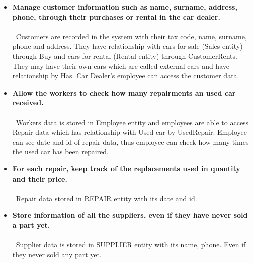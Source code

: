 \begin{itemize}
	\item \textbf{Manage customer information such as name, surname, address, phone, through their purchases or rental in the car dealer.}\\\\
	\,
	Customers are recorded in the system with their tax code, name, surname, phone and address. They have relationship with cars for sale (Sales entity) through Buy and cars for rental (Rental entity) through CustomerRents. They may have their own cars which are called external cars and have relationship by Has. Car Dealer’s employee can access the customer data.
	\item \textbf{Allow the workers to check how many repairments an used car received.}\\\\
	\,
	Workers data is stored in Employee entity and employees are able to access Repair data which has relationship with Used car by UsedRepair. Employee can see date and id of repair data, thus employee can check how many times the used car has been repaired. 
	\item \textbf{For each repair, keep track of the replacements used in quantity and their price.}\\\\
	\,
	Repair data stored in REPAIR entity with its date and id.
	\item \textbf{Store information of all the suppliers, even if they have never sold a part yet.}\\\\
	\,
    Supplier data is stored in SUPPLIER entity with its name, phone. Even if they never sold any part yet.


\end{itemize}

